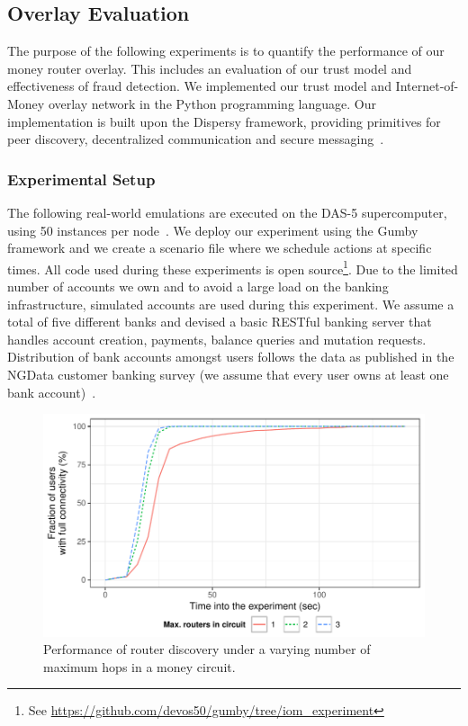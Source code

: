 \subsection{Overlay Evaluation}
The purpose of the following experiments is to quantify the performance of our money router overlay.
This includes an evaluation of our trust model and effectiveness of fraud detection.
We implemented our trust model and Internet-of-Money overlay network in the Python programming language.
Our implementation is built upon the Dispersy framework, providing primitives for peer discovery, decentralized communication and secure messaging~\cite{zeilemaker2013dispersy}.

\subsubsection*{Experimental Setup}
The following real-world emulations are executed on the DAS-5 supercomputer, using 50 instances per node~\cite{bal2016medium}.
We deploy our experiment using the Gumby framework and we create a scenario file where we schedule actions at specific times.
All code used during these experiments is open source\footnote{See \url{https://github.com/devos50/gumby/tree/iom\_experiment}}.
Due to the limited number of accounts we own and to avoid a large load on the banking infrastructure, simulated accounts are used during this experiment.
We assume a total of five different banks and devised a basic RESTful banking server that handles account creation, payments, balance queries and mutation requests.
Distribution of bank accounts amongst users follows the data as published in the NGData customer banking survey (we assume that every user owns at least one bank account)~\cite{ngdata2014consumer}.

\begin{figure}[!t]
	\centering
	\includegraphics[width=.8\linewidth]{iom/assets/router_discovery_times}
	\caption{Performance of router discovery under a varying number of maximum hops in a money circuit.}
	\label{fig:router_discovery_times}
\end{figure}


